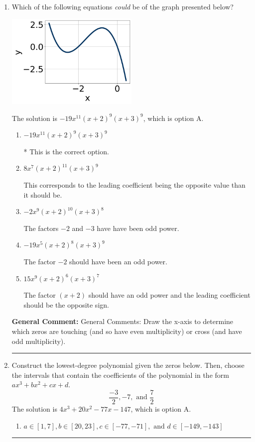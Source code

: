\documentclass{extbook}[14pt]
\newcommand{\litem}[1]{\item #1

\rule{\textwidth}{0.4pt}}
\begin{document}
\begin{enumerate}\litem{
Which of the following equations \textit{could} be of the graph presented below?

\begin{center}
    \includegraphics[width=0.5\textwidth]{../Figures/polyGraphToFunctionA.png}
\end{center}


The solution is \( -19x^{11} (x + 2)^{9} (x + 3)^{9} \), which is option A.\begin{enumerate}[label=\Alph*.]
\item \( -19x^{11} (x + 2)^{9} (x + 3)^{9} \)

* This is the correct option.
\item \( 8x^{7} (x + 2)^{11} (x + 3)^{9} \)

This corresponds to the leading coefficient being the opposite value than it should be.
\item \( -2x^{9} (x + 2)^{10} (x + 3)^{8} \)

The factors $-2$ and $-3$ have have been odd power.
\item \( -19x^{5} (x + 2)^{8} (x + 3)^{9} \)

The factor $-2$ should have been an odd power.
\item \( 15x^{9} (x + 2)^{6} (x + 3)^{7} \)

The factor $(x + 2)$ should have an odd power and the leading coefficient should be the opposite sign.
\end{enumerate}

\textbf{General Comment:} General Comments: Draw the x-axis to determine which zeros are touching (and so have even multiplicity) or cross (and have odd multiplicity).
}
\litem{
Construct the lowest-degree polynomial given the zeros below. Then, choose the intervals that contain the coefficients of the polynomial in the form $ax^3+bx^2+cx+d$.
\[ \frac{-3}{2}, -7, \text{ and } \frac{7}{2} \]The solution is \( 4x^{3} +20 x^{2} -77 x -147 \), which is option A.\begin{enumerate}[label=\Alph*.]
\item \( a \in [1, 7], b \in [20, 23], c \in [-77, -71], \text{ and } d \in [-149, -143] \)


\end{enumerate}}
\end{enumerate}
\end{document}
